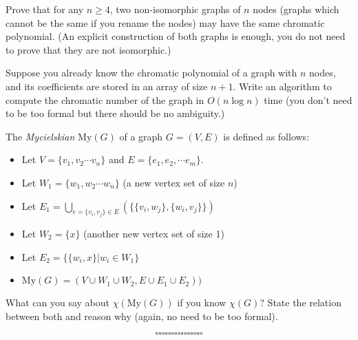 \documentclass[12pt]{exam}
\begin{document}
\begin{questions}
\begin{parts}
\end{parts}

\question Prove that for any $n \geq 4$, two non-isomorphic graphs of $n$ nodes (graphs which cannot be the same if you rename the nodes) may have the same chromatic polynomial. (An explicit construction of both graphs is enough, you do not need to prove that they are not isomorphic.) 

\question Suppose you already know the chromatic polynomial of a graph with $n$ nodes, and its coefficients are stored in an array of size $n+1$. Write an algorithm to compute the chromatic number of the graph in $O(n \log n)$ time (you don't need to be too formal but there should be no ambiguity.) 

\question The \textit{Mycielskian} $\text{My}(G)$ of a graph $G = (V, E)$ is defined as follows:

\begin{itemize}
    \item Let $V = \{v_1, v_2 \cdots v_n\}$ and $E = \{e_1, e_2, \cdots e_m\}$.
    \item Let $W_1 = \{w_1, w_2 \cdots w_n\}$ (a new vertex set of size $n$)
    \item Let $E_1 = \bigcup_{e = \{v_i, v_j\} \in E}(\{\{v_i, w_j\}, \{w_i, v_j\}\})$
    \item Let $W_2 = \{x\}$ (another new vertex set of size 1)
    \item Let $E_2 = \{\{w_i, x\} | w_i \in W_1\}$
    \item $\text{My}(G) = (V \cup W_1 \cup W_2, E \cup E_1 \cup E_2))$
    
\end{itemize}

What can you say about $\chi(\text{My}(G))$ if you know $\chi(G)$? State the relation between both and reason why (again, no need to be too formal). 

\end{questions}

$$\square \square \square \square \square \square \square \square \square \square \square \square \square \square \square $$
\end{document}
